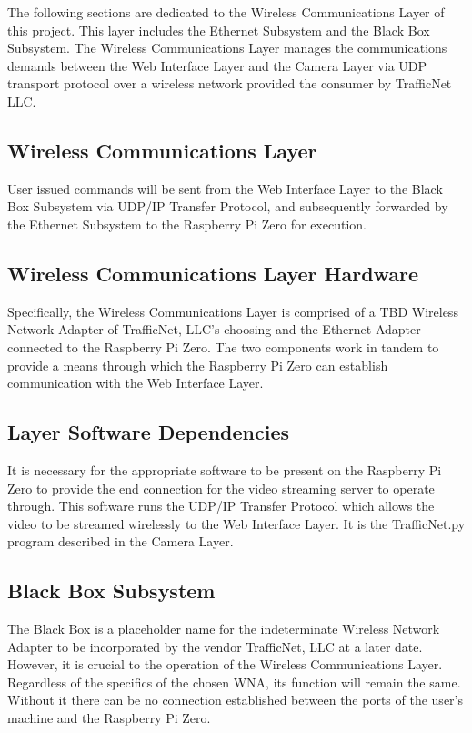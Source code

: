 The following sections are dedicated to the Wireless Communications Layer of this project. This layer includes the Ethernet Subsystem and the Black Box Subsystem. The Wireless Communications Layer manages the communications demands between the Web Interface Layer and the Camera Layer via UDP transport protocol over a wireless network provided the consumer by TrafficNet LLC.

\subsection{Wireless Communications Layer}
User issued commands will be sent from the Web Interface Layer to the Black Box Subsystem via UDP/IP Transfer Protocol, and subsequently forwarded by the Ethernet Subsystem to the Raspberry Pi Zero for execution.   

\subsection{Wireless Communications Layer Hardware}
Specifically, the Wireless Communications Layer is comprised of a TBD Wireless Network Adapter of TrafficNet, LLC's choosing and the Ethernet Adapter connected to the Raspberry Pi Zero. The two components work in tandem to provide a means through which the Raspberry Pi Zero can establish communication with the Web Interface Layer.

\subsection{Layer Software Dependencies}
It is necessary for the appropriate software to be present on the Raspberry Pi Zero to provide the end connection for the video streaming server to operate through. This software runs the UDP/IP Transfer Protocol which allows the video to be streamed wirelessly to the Web Interface Layer. It is the TrafficNet.py program described in the Camera Layer.

\subsection{Black Box Subsystem}
The Black Box is a placeholder name for the indeterminate Wireless Network Adapter to be incorporated by the vendor TrafficNet, LLC at a later date. However, it is crucial to the operation of the Wireless Communications Layer. Regardless of the specifics of the chosen WNA, its function will remain the same. Without it there can be no connection established between the ports of the user's machine and the Raspberry Pi Zero.

